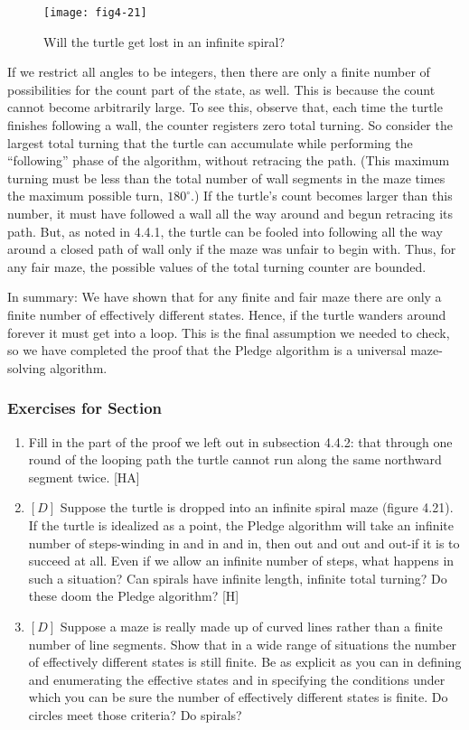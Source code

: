 \documentclass{book}
\begin{document}
\begin{figure}
\begin{center}
\texttt{[image: fig4-21]}
\caption{Will the turtle get lost in an infinite spiral?}
\end{center}
\end{figure}

If we restrict all angles to be integers, then there are only a finite
number of possibilities for the count part of the state, as well. This is
because the count cannot become arbitrarily large. To see this, observe
that, each time the turtle finishes following a wall, the counter registers
zero total turning. So consider the largest total turning that the turtle
can accumulate while performing the ``following'' phase of the algorithm,
without retracing the path. (This maximum turning must be less than
the total number of wall segments in the maze times the maximum
possible turn, $180^{\circ}$.) If the turtle's count becomes larger than this
number, it must have followed a wall all the way around and begun
retracing its path. But, as noted in 4.4.1, the turtle can be fooled into
following all the way around a closed path of wall only if the maze was
unfair to begin with. Thus, for any fair maze, the possible values of the
total turning counter are bounded.

In summary: We have shown that for any finite and fair maze there
are only a finite number of effectively different states. Hence, if the
turtle wanders around forever it must get into a loop. This is the final
assumption we needed to check, so we have completed the proof that
the Pledge algorithm is a universal maze-solving algorithm.

\subsubsection{Exercises for Section \thesection}
\begin{enumerate}
\item Fill in the part of the proof we left out in subsection 4.4.2: that
through one round of the looping path the turtle cannot run along the
same northward segment twice. [HA]

\item $[D]$ Suppose the turtle is dropped into an infinite spiral maze (figure
4.21). If the turtle is idealized as a point, the Pledge algorithm will take
an infinite number of steps-winding in and in and in, then out and out
and out-if it is to succeed at all. Even if we allow an infinite number
of steps, what happens in such a situation? Can spirals have infinite
length, infinite total turning? Do these doom the Pledge algorithm? [H]

\item $[D]$ Suppose a maze is really made up of curved lines rather than a
finite number of line segments. Show that in a wide range of situations
the number of effectively different states is still finite. Be as explicit as
you can in defining and enumerating the effective states and in specifying
the conditions under which you can be sure the number of effectively
different states is finite. Do circles meet those criteria? Do spirals?
\end{enumerate}
\end{document}
